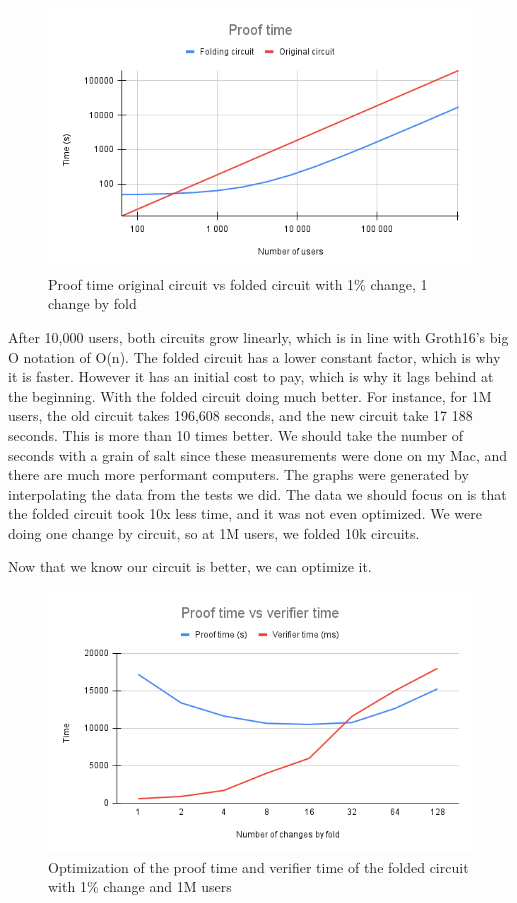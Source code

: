\begin{figure}[H]
   \centering
   \includegraphics[width=130mm]{Proof time.png}
   \caption{Proof time original circuit vs folded circuit with 1\% change, 1 change by fold}
   \label{overflow}
   \end{figure}

After 10,000 users, both circuits grow linearly, which is in line with Groth16's big O notation of O(n). The folded circuit has a lower constant factor, which is why it is faster. 
However it has an initial cost to pay, which is why it lags behind at the beginning. With the folded circuit doing much better. For instance,
for 1M users, the old circuit takes 196,608 seconds, and the new circuit take 17 188 seconds. This is more than 10 times better.
We should take the number of seconds with a grain of salt since these measurements were done on my Mac, and there are much more performant computers.
The graphs were generated by interpolating the data from the tests we did.
The data we should focus on is that the folded circuit took 10x less time, and it was not even optimized. We were doing one change by circuit, so at 1M users, we folded 10k circuits.

Now that we know our circuit is better, we can optimize it.



\begin{figure}[H]
   \centering
   \includegraphics[width=130mm]{Proof time vs verifier time.png}
   \caption{Optimization of the proof time and verifier time of the folded circuit with 1\% change and 1M users}
   \label{overflow}
   \end{figure}

